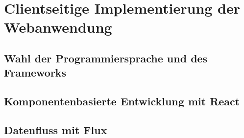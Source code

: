\chapter{Clientseitige Implementierung der Webanwendung}

\section{Wahl der Programmiersprache und des Frameworks}


\section{Komponentenbasierte Entwicklung mit React}


\section{Datenfluss mit Flux}
